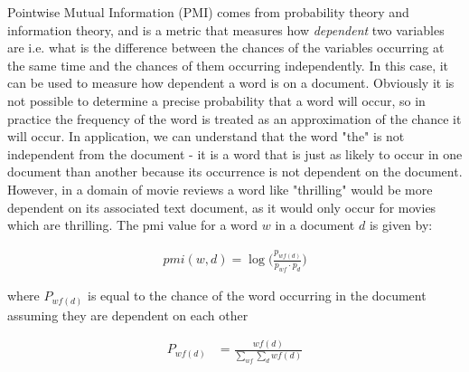 



Pointwise Mutual Information (PMI) comes from probability theory and information theory, and is a metric that measures how \textit{dependent}  two variables are i.e. what is the difference between the chances of the variables occurring  at the same time and the chances of them occurring independently. In this case, it can be used to measure how dependent a word is on a document. Obviously it is not possible to determine a precise probability that a word will occur, so in practice the frequency of the word is treated as an approximation of the chance it will occur. In application, we can understand that the word "the" is not independent from the document - it is a word that is just as likely to occur in one document than another because its occurrence is not dependent on the document. However, in a domain of movie reviews a word like "thrilling" would be more dependent on its associated text document, as it would only occur for movies which are thrilling. The pmi value for a word $w$ in a document  $d$ is given by:


\begin{align*}
\textit{pmi}(w, d) = \log\big(\frac{p_{{wf}(d)}}{p_{wf} \cdotp p_{d}}\big)
\end{align*}

where $P_{{wf}(d)}$ is equal to the chance of the word occurring in the document assuming they are dependent on each other 



\begin{align*}
P_{{wf}(d)} &= \frac{{wf}(d)}{\sum_{wf} \sum_{d} {wf}(d)}
\end{align*}

